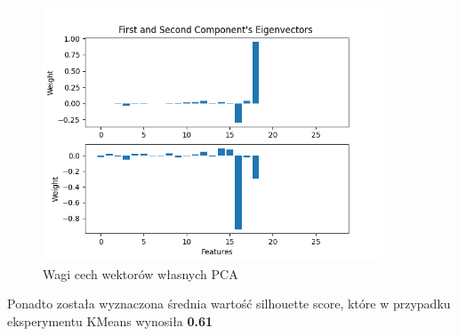 \documentclass{classrep}
\begin{document}
{{{                \begin{figure}[!htbp]
                    \centering
                    \includegraphics[width=0.9\textwidth]{img/clustering/pca_weights.png}
                    \caption{Wagi cech wektorów własnych PCA}
                    \label{clust_pca_weights}
                \end{figure}
                \FloatBarrier

                Ponadto została wyznaczona średnia wartość silhouette score, które w
                przypadku eksperymentu KMeans wynosiła \textbf{0.61}
                
}}}
\end{document}
